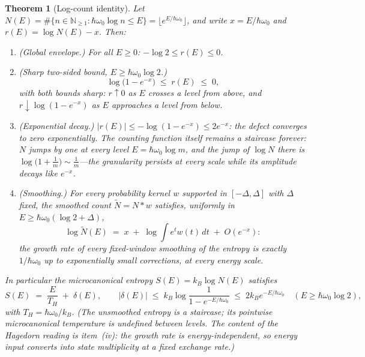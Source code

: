 \documentclass[11pt,a4paper]{article}
\theoremstyle{plain}
\newtheorem{theorem}{Theorem}[section]
\theoremstyle{definition}
\theoremstyle{remark}
\newcommand{\Nn}{\mathbb{N}}
\begin{document}
\begin{theorem}[Log-count identity]\label{thm:logcount}
Let $N(E)=\#\{n\in\Nn_{\geq1}:\hbar\omega_{0}\log n\leq E\}=\lfloor e^{E/\hbar\omega_{0}}\rfloor$,
and write $x=E/\hbar\omega_{0}$ and $r(E)=\log N(E)-x$. Then:
\begin{enumerate}[leftmargin=1.6em]
\item (Global envelope.) For all $E\geq0$: $-\log2\leq r(E)\leq0$.
\item (Sharp two-sided bound, $E\geq\hbar\omega_{0}\log2$.)
\begin{equation}\label{eq:sharpdefect}
\log\bigl(1-e^{-x}\bigr)\;\leq\; r(E)\;\leq\; 0,
\end{equation}
with both bounds sharp: $r\uparrow0$ as $E$ crosses a level from above, and
$r\downarrow\log(1-e^{-x})$ as $E$ approaches a level from below.
\item (Exponential decay.) $|r(E)|\leq-\log(1-e^{-x})\leq 2e^{-x}$: the defect converges to
zero \emph{exponentially}. The counting function itself remains a staircase forever: $N$
jumps by one at every level $E=\hbar\omega_{0}\log m$, and the jump of $\log N$ there is
$\log\bigl(1+\tfrac1m\bigr)\sim\tfrac1m$---the granularity persists at every scale while its
amplitude decays like $e^{-x}$.
\item (Smoothing.) For every probability kernel $w$ supported in $[-\Delta,\Delta]$ with
$\Delta$ fixed, the smoothed count $\widetilde N=N\ast w$ satisfies, uniformly in
$E\geq\hbar\omega_{0}(\log2+\Delta)$,
\begin{equation}\label{eq:smoothing}
\log\widetilde N(E)\;=\;x\;+\;\log\!\int e^{t}w(t)\,dt\;+\;O(e^{-x}):
\end{equation}
the growth rate of every fixed-window smoothing of the entropy is exactly $1/\hbar\omega_{0}$
up to exponentially small corrections, at every energy scale.
\end{enumerate}
In particular the microcanonical entropy $S(E)=k_{B}\log N(E)$ satisfies
\begin{equation}
S(E)\;=\;\frac{E}{T_{H}}\;+\;\delta(E),
\qquad
|\delta(E)|\;\leq\;k_{B}\log\frac{1}{1-e^{-E/\hbar\omega_{0}}}\;\leq\;2k_{B}e^{-E/\hbar\omega_{0}}
\quad(E\geq\hbar\omega_{0}\log2),
\end{equation}
with $T_{H}=\hbar\omega_{0}/k_{B}$. (The unsmoothed entropy is a staircase; its pointwise
microcanonical temperature is undefined between levels. The content of the Hagedorn reading
is item~(iv): the growth rate is energy-independent, so energy input converts into state
multiplicity at a fixed exchange rate.)
\end{theorem}
\end{document}
